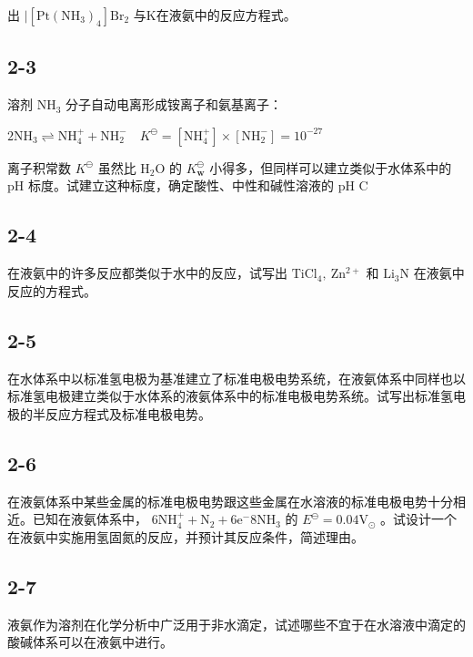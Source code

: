 出 $\mathrm { | [ P t ( N H _ { 3 } ) _ { 4 } ] B r _ { 2 } }$ 与K在液氨中的反应⽅程式。

\subsection*{2-3}
溶剂 $\mathrm { N H _ { 3 } }$ 分⼦⾃动电离形成铵离⼦和氨基离⼦：

$
2 \mathrm{NH} _ {3} \rightleftharpoons \mathrm{NH} _ {4} ^ {+} + \mathrm{NH} _ {2} ^ {-} \quad K ^ {\ominus} = [ \mathrm{NH} _ {4} ^ {+} ] \times [ \mathrm{NH} _ {2} ^ {-} ] = 1 0 ^ {- 2 7}
$

离⼦积常数 $K ^ { \ominus }$ 虽然⽐ $\mathrm { H _ { 2 } O }$ 的 $K _ { \mathbf { w } } ^ { \ominus }$ ⼩得多，但同样可以建⽴类似于⽔体系中的 $\mathrm { p H }$ 标度。试建⽴这种标度，确定酸性、中性和碱性溶液的 $\mathrm { p H }$ C

\subsection*{2-4}
在液氨中的许多反应都类似于⽔中的反应，试写出 $\mathrm { T i C l _ { 4 } , \ Z n ^ { 2 + } }$ 和 $\mathrm { L i _ { 3 } N }$ 在液氨中反应的⽅程式。

\subsection*{2-5}
在⽔体系中以标准氢电极为基准建⽴了标准电极电势系统，在液氨体系中同样也以标准氢电极建⽴类似于⽔体系的液氨体系中的标准电极电势系统。试写出标准氢电极的半反应⽅程式及标准电极电势。

\subsection*{2-6}
在液氨体系中某些⾦属的标准电极电势跟这些⾦属在⽔溶液的标准电极电势⼗分相近。已知在液氨体系中， $6 \mathrm { N H _ { 4 } ^ { + } + N _ { 2 } + 6 e ^ { - }  8 N H _ { 3 } }$ 的 $E ^ { \ominus } = 0 . 0 4 \mathrm { V } _ { \odot }$ 。试设计⼀个在液氨中实施⽤氢固氮的反应，并预计其反应条件，简述理由。

\subsection*{2-7}
液氨作为溶剂在化学分析中⼴泛⽤于⾮⽔滴定，试述哪些不宜于在⽔溶液中滴定的酸碱体系可以在液氨中进⾏。
